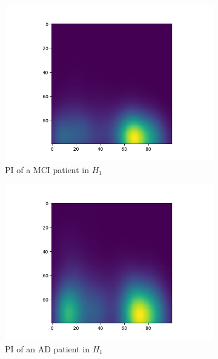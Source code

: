 \documentclass{article}
\begin{document}
\begin{figure}
\begin{subfigure}{0.3\textwidth}
    \includegraphics[width=\textwidth]{figures/PIs/Persistence_image_MCI_h_1.png}
    \caption{PI of a MCI patient in $H_1$}
  \end{subfigure}
  \begin{subfigure}{0.3\textwidth}
    \includegraphics[width=\textwidth]{figures/PIs/Persistence_image_AD_h_1.png}
    \caption{PI of an AD patient in $H_1$}
  \end{subfigure}
  \begin{subfigure}{0.3\textwidth}

\end{subfigure}
\end{figure}
\end{document}
